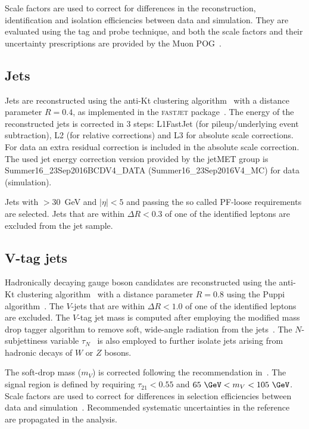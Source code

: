 Scale factors are used to correct for differences in the reconstruction, identification and isolation efficiencies between data and simulation. They are evaluated using the tag and probe technique, and both the scale factors and their uncertainty prescriptions are provided by the Muon POG~\cite{Twiki:MuonSF2016}.

\subsection{Jets}
\label{subsec:jets}
Jets are reconstructed using the anti-Kt clustering algorithm~\cite{antikt}  with a distance parameter $R=0.4$, as implemented in the \textsc{fastjet}  package~\cite{Cacciari:fastjet1,Cacciari:fastjet2}. The energy of the reconstructed jets is corrected in 3 steps: L1FastJet (for pileup/underlying event subtraction), L2 (for relative corrections) and L3 for absolute scale corrections. For data an extra residual correction is included in the absolute scale correction.
The used jet energy correction version provided by the jetMET group is Summer16\_23Sep2016BCDV4\_DATA 
(Summer16\_23Sep2016V4\_MC) for data (simulation).

Jets with \pt$>$30~GeV and $\mathopen|\eta\mathclose|<5$ and passing the so called PF-loose requirements are selected. Jets that are within $\Delta R < 0.3$ of one of the identified leptons are excluded from the jet sample. 

\subsection{V-tag jets}
Hadronically decaying gauge boson candidates are reconstructed using the anti-Kt clustering algorithm~\cite{antikt} with a distance parameter $R=0.8$ using the Puppi algorithm~\cite{Bertolini:2014bba}. The $V$-jets that are within $\Delta R < 1.0$ of one of the identified leptons are excluded. The $V$-tag jet mass is computed after employing the modified mass drop tagger algorithm to remove soft, wide-angle radiation from the jets~\cite{Dasgupta:2013ihk,Larkoski:2014wba}. The $N$-subjettiness variable $\tau_N$~\cite{Thaler:2010tr} is also employed to further isolate jets arising from hadronic decays of $W$ or $Z$ bosons.   

The soft-drop mass ($m_{V}$) is corrected following the recommendation in~\cite{jettagging}. The signal region is defined by requiring $\tau_{21}<0.55$ and $ 65 ~\GeV < m_{V} < 105 ~\GeV$. Scale factors are used to correct for differences in selection efficiencies between data and simulation~\cite{jettagging}. Recommended systematic uncertainties in the reference~\cite{jettagging} are propagated in the analysis. 

